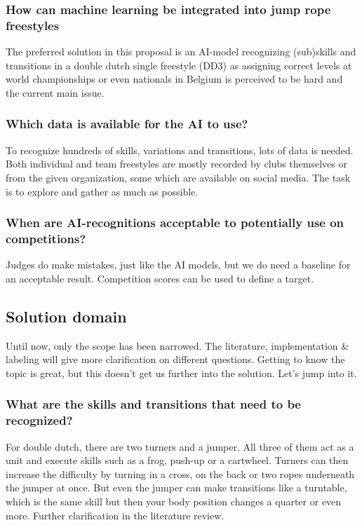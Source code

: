 \subsubsection{How can machine learning be integrated into jump rope freestyles}

The preferred solution in this proposal is an AI-model recognizing (sub)skills and transitions in a double dutch single freestyle (DD3) as assigning correct levels at world championships or even nationals in Belgium is perceived to be hard and the current main issue.

\subsubsection{Which data is available for the AI to use?}

To recognize hundreds of skills, variations and transitions, lots of data is needed. Both individual and team freestyles are mostly recorded by clubs themselves or from the given organization, some which are available on social media. The task is to explore and gather as much as possible. 

\subsubsection{When are AI-recognitions acceptable to potentially use on competitions?}

Judges do make mistakes, just like the AI models, but we do need a baseline for an acceptable result. Competition scores can be used to define a target.


\subsection{Solution domain}

Until now, only the scope has been narrowed. The literature, implementation \& labeling will give more clarification on different questions. Getting to know the topic is great, but this doesn't get us further into the solution. Let's jump into it.

\subsubsection{What are the skills and transitions that need to be recognized?}
For double dutch, there are two turners and a jumper. All three of them act as a unit and execute skills such as a frog, push-up or a cartwheel. Turners can then increase the difficulty by turning in a cross, on the back or two ropes underneath the jumper at once. But even the jumper can make transitions like a turntable, which is the same skill but then your body position changes a quarter or even more. Further clarification in the literature review.

